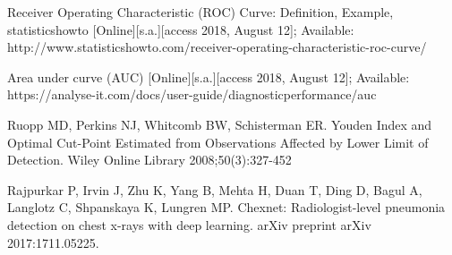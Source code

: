 \documentclass[15pt]{report}
\begin{document}
\begin{thebibliography}{cc}
  Receiver Operating Characteristic (ROC) Curve: Definition, Example, statisticshowto [Online][s.a.][access 2018, August 12]; Available: http://www.statisticshowto.com/receiver-operating-characteristic-roc-curve/ 

 Area under curve (AUC) [Online][s.a.][access 2018, August 12]; Available: https://analyse-it.com/docs/user-guide/diagnosticperformance/auc

 Ruopp MD, Perkins NJ, Whitcomb BW, Schisterman ER. Youden Index and Optimal Cut-Point Estimated from Observations Affected by Lower Limit of Detection. Wiley Online Library 2008;50(3):327-452

 Rajpurkar P, Irvin J, Zhu K, Yang B, Mehta H, Duan T, Ding D, Bagul A, Langlotz C, Shpanskaya K, Lungren MP. Chexnet: Radiologist-level pneumonia detection on chest x-rays with deep learning. arXiv preprint arXiv 2017:1711.05225.

\end{thebibliography}
\end{document}

